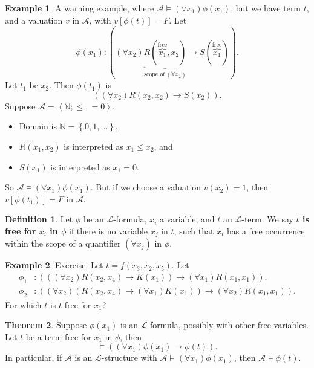 \documentclass{article}
\newcommand{\N}{\mathbb{N}}
\newcommand{\A}{\mathcal{A}}
\renewcommand{\L}{\mathcal{L}}
\newcommand{\rb}[1]{\left( #1 \right)}
\renewcommand{\sb}[1]{\left[ #1 \right]}
\newcommand{\cb}[1]{\left\{ #1 \right\}}
\newcommand{\ab}[1]{\left\langle #1 \right\rangle}
\newcommand{\impb}[2]{\rb{#1 \rightarrow #2}}
\newcommand{\fab}[1]{\rb{\forall #1}}
\theoremstyle{definition}\newtheorem{definition}{Definition}[subsection]
\theoremstyle{definition}\newtheorem{remark1}[definition]{Remark}
\theoremstyle{definition}\newtheorem{example1}[definition]{Example}
\theoremstyle{definition}\newtheorem*{remark2}{Remark}
\theoremstyle{definition}\newtheorem*{example2}{Example}
\theoremstyle{definition}\newtheorem*{note}{Note}
\theoremstyle{definition}\newtheorem*{notation}{Notation}
\newtheorem{theorem}[definition]{Theorem}
\begin{document}
\begin{example2}
A warning example, where $ \A \vDash \fab{x_1}\phi\rb{x_1} $, but we have term $ t $, and a valuation $ v $ in $ \A $, with $ v\sb{\phi\rb{t}} = F $. Let
$$ \phi\rb{x_1} : \impb{\fab{x_2}\underbrace{R\rb{\overbrace{x_1}^{\text{free}}, x_2}}_{\text{scope of} \ \fab{x_2}}}{S\rb{\overbrace{x_1}^{\text{free}}}}. $$
Let $ t_1 $ be $ x_2 $. Then $ \phi\rb{t_1} $ is
$$ \impb{\fab{x_2}R\rb{x_2, x_2}}{S\rb{x_2}}. $$
Suppose $ \A = \ab{\N; \le, = 0} $.
\begin{itemize}
\item Domain is $ \N = \cb{0, 1, \dots} $,
\item $ R\rb{x_1, x_2} $ is interpreted as $ x_1 \le x_2 $, and
\item $ S\rb{x_1} $ is interpreted as $ x_1 = 0 $.
\end{itemize}
So $ \A \vDash \fab{x_1}\phi\rb{x_1} $. But if we choose a valuation $ v\rb{x_2} = 1 $, then $ v\sb{\phi\rb{t_1}} = F $ in $ \A $.
\end{example2}

\pagebreak

\begin{definition}
Let $ \phi $ be an $ \L $-formula, $ x_i $ a variable, and $ t $ an $ \L $-term. We say \textbf{$ t $ is free for $ x_i $ in $ \phi $} if there is no variable $ x_j $ in $ t $, such that $ x_i $ has a free occurrence within the scope of a quantifier $ \fab{x_j} $ in $ \phi $.
\end{definition}

\begin{example2}
Exercise. Let $ t = f\rb{x_3, x_2, x_5} $. Let
\begin{align*}
\phi_1 & : \impb{\impb{\fab{x_2}R\rb{x_2, x_4}}{K\rb{x_1}}}{\fab{x_1}R\rb{x_1, x_1}}, \\
\phi_2 & : \impb{\fab{x_2}\impb{R\rb{x_2, x_4}}{\fab{x_1}K\rb{x_1}}}{\fab{x_2}R\rb{x_1, x_1}}.
\end{align*}
For which $ t $ is $ t $ free for $ x_1 $?
\end{example2}

\begin{theorem}
\label{thm:2.3.6}
Suppose $ \phi\rb{x_1} $ is an $ \L $-formula, possibly with other free variables. Let $ t $ be a term free for $ x_1 $ in $ \phi $, then
$$ \vDash \impb{\fab{x_1}\phi\rb{x_1}}{\phi\rb{t}}. $$
In particular, if $ \A $ is an $ \L $-structure with $ \A \vDash \fab{x_1}\phi\rb{x_1} $, then $ \A \vDash \phi\rb{t} $.
\end{theorem}
\end{document}

